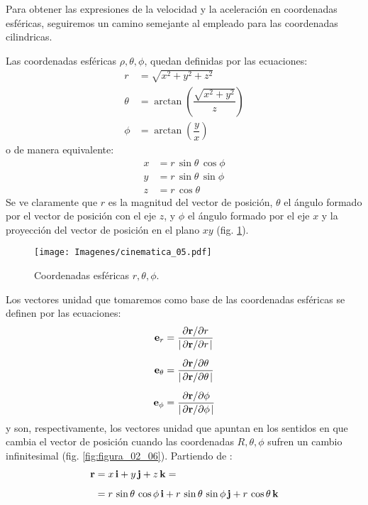 Para obtener las expresiones de la velocidad y la aceleración en coordenadas esféricas, seguiremos un camino semejante al empleado para las coordenadas cilindricas. 
\par
Las coordenadas esféricas $\rho, \theta, \phi$, quedan definidas por las ecuaciones:
\begin{align}
r &= \sqrt{x^{2} + y^{2} + z^{2}} \label{eq:ecuacion_02_30} \\
\theta &= \arctan \left( \dfrac{\sqrt{x^{2} + y^{2}}}{z} \right) \label{eq:ecuacion_02_31} \\
\phi &= \arctan \left( \dfrac{y}{x} \right) \label{eq:ecuacion_02_32}
\end{align}
o de manera equivalente:
\begin{align}
    x &= r \, \sin \theta \, \cos \phi \label{eq:ecuacion_02_33} \\
    y &= r \, \sin \theta \, \sin \phi \label{eq:ecuacion_02_34} \\
    z &= r \, \cos \theta \label{eq:ecuacion_02_35}
\end{align}
Se ve claramente que $r$ es la magnitud del vector de posición, $\theta$ el ángulo formado por el vector de posición con el eje $z$, y $\phi$ el ángulo formado por el eje $x$ y la proyección del vector de posición en el plano $x y$ (fig. \ref{fig:figura_02_05}). 
\begin{figure}[H]
    \centering
    \texttt{[image: Imagenes/cinematica\_05.pdf]}
    \caption{Coordenadas esféricas $r, \theta, \phi$.}
    \label{fig:figura_02_05}
\end{figure}
Los vectores unidad que tomaremos como base de las coordenadas esféricas se definen por las ecuaciones:
\begin{align}
\vb{e}_{r} &= \dfrac{\pdv*{\vb{r}}{r}}{\abs{\pdv*{\vb{r}}{r}}} \label{eq:ecuacion_02_36} \\[0.5em]
\vb{e}_{\theta} &= \dfrac{\pdv*{\vb{r}}{\theta}}{\abs{\pdv*{\vb{r}}{\theta}}} \label{eq:ecuacion_02_37} \\[0.5em]
\vb{e}_{\phi} &= \dfrac{\pdv*{\vb{r}}{\phi}}{\abs{\pdv*{\vb{r}}{\phi}}} \label{eq:ecuacion_02_38}
\end{align}
y son, respectivamente, los vectores unidad que apuntan en los sentidos en que cambia el vector de posición cuando las coordenadas $R, \theta, \phi$ sufren un cambio infinitesimal (fig. \ref{fig:figura_02_06}). Partiendo de :
\begin{align}
\begin{aligned}
\vb{r} &= x \, \vb{i} + y \, \vb{j} + z \, \vb{k} = \\[0.5em]
&= r \, \sin \theta \, \cos \phi \, \vb{i} + r \, \sin \theta \, \sin \phi \, \vb{j} + r \, \cos \theta \, \vb{k}
\end{aligned}
\label{eq:ecuacion_02_39}
\end{align}
